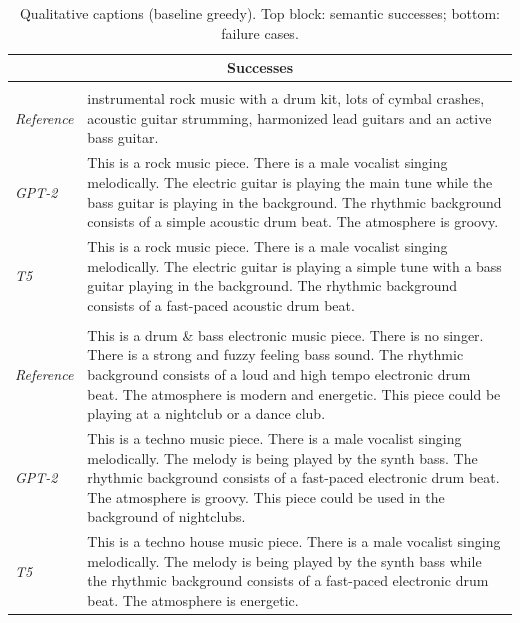\begin{table}[ht]\centering\footnotesize
\caption{Qualitative captions (baseline greedy). Top block: semantic successes; bottom: failure cases.}
\label{tab:qualitative}
\begin{tabularx}{\textwidth}{lX}
\toprule
\multicolumn{2}{c}{\textbf{Successes}} \\
\midrule
\multicolumn{2}{l}{} \\[-0.5em]
\textit{Reference} & instrumental rock music with a drum kit, lots of cymbal crashes, acoustic guitar strumming, harmonized lead guitars and an active bass guitar. \\
\textit{GPT-2} & This is a rock music piece. There is a male vocalist singing melodically. The electric guitar is playing the main tune while the bass guitar is playing in the background. The rhythmic background consists of a simple acoustic drum beat. The atmosphere is groovy. \\
\textit{T5} & This is a rock music piece. There is a male vocalist singing melodically. The electric guitar is playing a simple tune with a bass guitar playing in the background. The rhythmic background consists of a fast-paced acoustic drum beat. \\
\midrule

\multicolumn{2}{l}{} \\[-0.5em]
\textit{Reference} & This is a drum \& bass electronic music piece. There is no singer. There is a strong and fuzzy feeling bass sound. The rhythmic background consists of a loud and high tempo electronic drum beat. The atmosphere is modern and energetic. This piece could be playing at a nightclub or a dance club. \\
\textit{GPT-2} & This is a techno music piece. There is a male vocalist singing melodically. The melody is being played by the synth bass. The rhythmic background consists of a fast-paced electronic drum beat. The atmosphere is groovy. This piece could be used in the background of nightclubs. \\
\textit{T5} & This is a techno house music piece. There is a male vocalist singing melodically. The melody is being played by the synth bass while the rhythmic background consists of a fast-paced electronic drum beat. The atmosphere is energetic. \\
\midrule


\end{tabularx}
\end{table}
